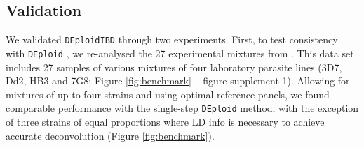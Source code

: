 \documentclass[9pt,lineno]{elife}
\begin{document}
\begin{figure}[ht]
\end{figure}


\subsection{Validation}

We validated \texttt{DEploidIBD} through two experiments.  First, to test consistency with \texttt{DEploid} \citet{Zhu2017}, we re-analysed the 27 experimental mixtures from \citep{Wendler2015}.  This data set includes 27 samples of various mixtures of four laboratory parasite lines (3D7, Dd2, HB3 and 7G8; Figure \ref{fig:benchmark} – figure supplement 1).  Allowing for mixtures of up to four strains and using optimal reference panels, we found comparable performance with the single-step \texttt{DEploid} method, with the exception of three strains of equal proportions where LD info is necessary to achieve accurate deconvolution (Figure \ref{fig:benchmark}).
\end{document}
